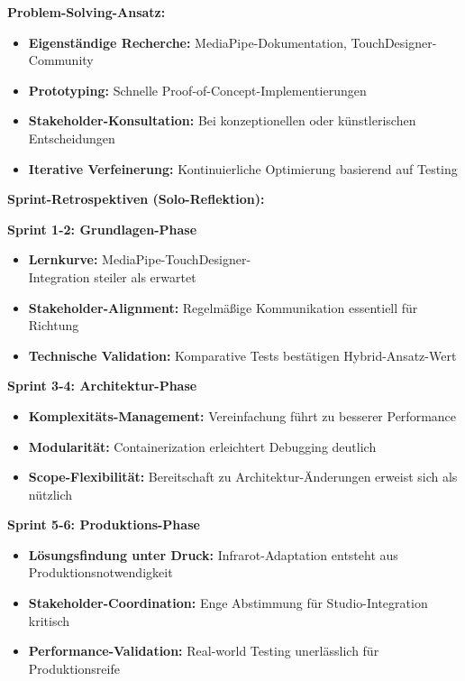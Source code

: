\textbf{Problem-Solving-Ansatz:}
\begin{itemize}
    \item \textbf{Eigenständige Recherche:} MediaPipe-Dokumentation, TouchDesigner-Community
    \item \textbf{Prototyping:} Schnelle Proof-of-Concept-Implementierungen
    \item \textbf{Stakeholder-Konsultation:} Bei konzeptionellen oder künstlerischen Entscheidungen
    \item \textbf{Iterative Verfeinerung:} Kontinuierliche Optimierung basierend auf Testing
\end{itemize}

\textbf{Sprint-Retrospektiven (Solo-Reflektion):}

\textbf{Sprint 1-2: Grundlagen-Phase}
\begin{itemize}
    \item \textbf{Lernkurve:} MediaPipe-TouchDesigner-\\Integration steiler als erwartet
    \item \textbf{Stakeholder-Alignment:} Regelmäßige Kommunikation essentiell für Richtung
    \item \textbf{Technische Validation:} Komparative Tests bestätigen Hybrid-Ansatz-Wert
\end{itemize}

\textbf{Sprint 3-4: Architektur-Phase}
\begin{itemize}
    \item \textbf{Komplexitäts-Management:} Vereinfachung führt zu besserer Performance
    \item \textbf{Modularität:} Containerization erleichtert Debugging deutlich
    \item \textbf{Scope-Flexibilität:} Bereitschaft zu Architektur-Änderungen erweist sich als nützlich
\end{itemize}

\textbf{Sprint 5-6: Produktions-Phase}
\begin{itemize}
    \item \textbf{Lösungsfindung unter Druck:} Infrarot-Adaptation entsteht aus Produktionsnotwendigkeit
    \item \textbf{Stakeholder-Coordination:} Enge Abstimmung für Studio-Integration kritisch
    \item \textbf{Performance-Validation:} Real-world Testing unerlässlich für Produktionsreife
\end{itemize}